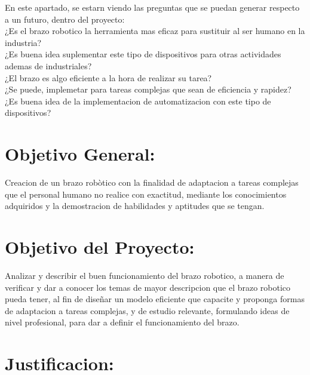 \documentclass[14pt,a4paper]{article}
\begin{document}
En este apartado, se estarn viendo las preguntas que se puedan generar respecto a un futuro, dentro del proyecto:\\


¿Es el brazo robotico la herramienta mas eficaz para sustituir al ser humano en la industria?\\
¿Es buena idea suplementar este tipo de dispositivos para otras actividades ademas de industriales?\\
¿El brazo es algo eficiente a la hora de realizar su tarea?\\
¿Se puede, implemetar para tareas complejas que sean de eficiencia y rapidez?\\
¿Es buena idea de la implementacion de automatizacion con este tipo de dispositivos? 

\section{Objetivo General:}

Creacion de un brazo robòtico con la finalidad de adaptacion a tareas complejas que el personal humano no realice con exactitud, mediante los conocimientos adquiridos y la demostracion de habilidades y aptitudes que se tengan. 

\section{Objetivo del Proyecto:}

Analizar y describir el buen funcionamiento del brazo robotico, a manera de verificar y dar a conocer los temas de mayor descripcion que el brazo robotico pueda tener, al fin de diseñar un modelo eficiente que capacite y proponga formas de adaptacion a tareas complejas, y de estudio relevante, formulando ideas de nivel profesional, para dar a definir el funcionamiento del brazo.

\section{Justificacion:}
\end{document}
